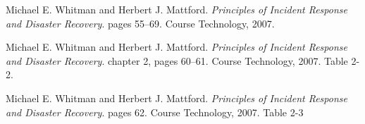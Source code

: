 \documentclass[english]{gucreport}
\begin{document}
	\makefrontpages
	\tableofcontents
	\showindex		%
	
	
	
	
	
	
	
	\begin{thebibliography}{99}
			Michael E. Whitman and Herbert J. Mattford.
			\emph{Principles of Incident Response and Disaster Recovery}.
			pages 55–69.
			Course Technology, 2007.
			
			Michael E. Whitman and Herbert J. Mattford.
			\emph{Principles of Incident Response and Disaster Recovery}.
			chapter 2, 	pages 60–61.
			Course Technology, 2007.
			Table 2-2.
			
			Michael E. Whitman and Herbert J. Mattford.
			\emph{Principles of Incident Response and Disaster Recovery}.
			pages 62.
			Course Technology, 2007.
			Table 2-3
	\end{thebibliography}

	\appendix %
\end{document}
